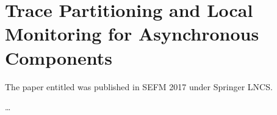 \chapter{Trace Partitioning and Local Monitoring for Asynchronous Components}\label{ch:appendix}

The paper entitled  was published in SEFM 2017 under Springer LNCS.

\dots